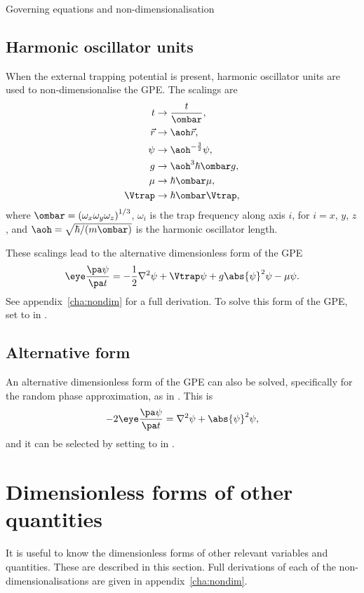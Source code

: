 \begin{chapter}{\label{cha:equations}Governing equations and
  non-dimensionalisation}
  \subsection{Harmonic oscillator units}
  When the external trapping potential is present, harmonic oscillator units
  are used to non-dimensionalise the GPE.  The scalings are
  \begin{equation}
    \begin{aligned}
      t       &\to \frac{t}{\ombar}, \\
      \vec{r} &\to \aoh\vec{r}, \\
      \psi    &\to \aoh^{-\frac{3}{2}} \psi, \\
      g       &\to \aoh^{3}\hbar\ombar g, \\
      \mu     &\to \hbar\ombar\mu, \\
      \Vtrap  &\to \hbar\ombar\Vtrap,
    \end{aligned}
    \label{eqn:ho_scalings}
  \end{equation}
  where $\ombar = \left( \omega_{x}\omega_{y}\omega_{z}
  \right)^{1/3}$, $\omega_{i}$ is the trap frequency along axis $i$, for $i =
  x$, $y$, $z$, and $\aoh = \sqrt{\hbar/(m\ombar)}$ is the
  harmonic oscillator length.

  These scalings lead to the alternative dimensionless form of the GPE
  \begin{equation*}
    \eye \frac{\pa \psi}{\pa t} = -\frac{1}{2}\nabla^{2}\psi + \Vtrap\psi +
    g\abs{\psi}^{2}\psi - \mu\psi.
  \end{equation*}
  See appendix~\ref{cha:nondim} for a full derivation.  To solve this form of
  the GPE, set  to  in .

  \subsection{Alternative form}
  An alternative dimensionless form of the GPE can also be solved, specifically
  for the random phase approximation, as in \citet{BS02}.  This is
  \begin{equation*}
    -2\eye\frac{\pa \psi}{\pa t} = \nabla^{2}\psi + \abs{\psi}^{2}\psi,
  \end{equation*}
  and it can be selected by setting  to  in
  .

  \section{Dimensionless forms of other quantities}
  It is useful to know the dimensionless forms of other relevant variables and
  quantities.  These are described in this section.  Full derivations of each
  of the non-dimensionalisations are given in appendix~\ref{cha:nondim}.


\end{chapter}
